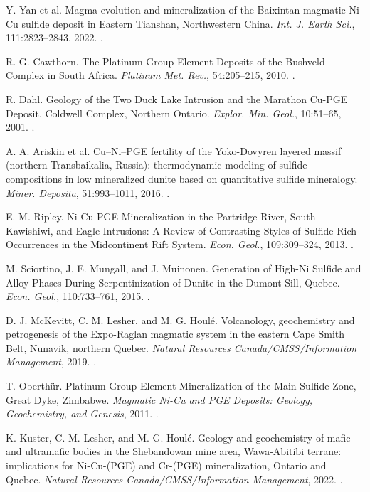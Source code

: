  Y. Yan et al. Magma evolution and mineralization of the Baixintan magmatic Ni--Cu sulfide deposit in Eastern Tianshan, Northwestern China. \textit{Int. J. Earth Sci.}, 111:2823--2843, 2022. .

 R. G. Cawthorn. The Platinum Group Element Deposits of the Bushveld Complex in South Africa. \textit{Platinum Met. Rev.}, 54:205--215, 2010. .

 R. Dahl. Geology of the Two Duck Lake Intrusion and the Marathon Cu-PGE Deposit, Coldwell Complex, Northern Ontario. \textit{Explor. Min. Geol.}, 10:51--65, 2001. .

 A. A. Ariskin et al. Cu--Ni--PGE fertility of the Yoko-Dovyren layered massif (northern Transbaikalia, Russia): thermodynamic modeling of sulfide compositions in low mineralized dunite based on quantitative sulfide mineralogy. \textit{Miner. Deposita}, 51:993--1011, 2016. .

 E. M. Ripley. Ni-Cu-PGE Mineralization in the Partridge River, South Kawishiwi, and Eagle Intrusions: A Review of Contrasting Styles of Sulfide-Rich Occurrences in the Midcontinent Rift System. \textit{Econ. Geol.}, 109:309--324, 2013. .

 M. Sciortino, J. E. Mungall, and J. Muinonen. Generation of High-Ni Sulfide and Alloy Phases During Serpentinization of Dunite in the Dumont Sill, Quebec. \textit{Econ. Geol.}, 110:733--761, 2015. .

 D. J. McKevitt, C. M. Lesher, and M. G. Houlé. Volcanology, geochemistry and petrogenesis of the Expo-Raglan magmatic system in the eastern Cape Smith Belt, Nunavik, northern Quebec. \textit{Natural Resources Canada/CMSS/Information Management}, 2019. .

 T. Oberthür. Platinum-Group Element Mineralization of the Main Sulfide Zone, Great Dyke, Zimbabwe. \textit{Magmatic Ni-Cu and PGE Deposits: Geology, Geochemistry, and Genesis}, 2011. .

 K. Kuster, C. M. Lesher, and M. G. Houlé. Geology and geochemistry of mafic and ultramafic bodies in the Shebandowan mine area, Wawa-Abitibi terrane: implications for Ni-Cu-(PGE) and Cr-(PGE) mineralization, Ontario and Quebec. \textit{Natural Resources Canada/CMSS/Information Management}, 2022. .

